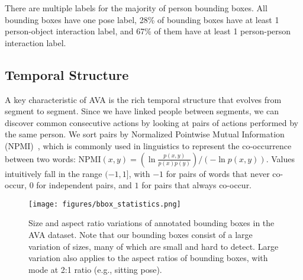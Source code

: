\documentclass[10pt,twocolumn,letterpaper]{article}
\begin{document}
There are multiple labels for the majority of person bounding boxes. All bounding boxes have one pose label, 28\% of bounding boxes have at least 1 person-object interaction label, and 67\% of them have at least 1 person-person interaction label.

\subsection{Temporal Structure}
\label{sec:temp_structure}

A key characteristic of AVA is the rich temporal structure that evolves from segment to segment. Since we have linked people between segments, we can discover common consecutive actions by looking at pairs of actions performed by the same person. We sort pairs by Normalized Pointwise Mutual Information (NPMI)~\cite{Church1990}, which is commonly used in linguistics to represent the co-occurrence between two words: $\mathrm{NPMI}(x,y)=\left(\ln{\frac{p(x,y)}{p(x)p(y)}}\right) / \left(-\ln{p(x,y)}\right)$. Values intuitively fall in the range $(-1, 1]$, with $-1$ for pairs of words that never co-occur, $0$ for independent pairs, and $1$ for pairs that always co-occur.

\begin{figure}[tbp]
\centering
\texttt{[image: figures/bbox\_statistics.png]}
\caption{Size and aspect ratio variations of annotated bounding boxes in the AVA dataset. Note that our bounding boxes consist of a large variation of sizes, many of which are small and hard to detect. Large variation also applies to the aspect ratios of bounding boxes, with mode at 2:1 ratio (e.g., sitting pose).}
\label{fig:bbox_stats}
\vspace{-1em}
\end{figure}
\end{document}
